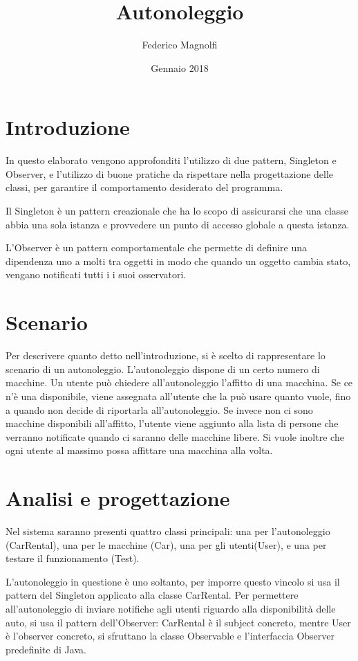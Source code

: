 \documentclass[]{article}
\newcommand{\subtitle}[1]{%
  \posttitle{%
    \par\end{center}
    \begin{center}\large#1\end{center}
    \vskip0.5em}%
}
\begin{document}
\title{Autonoleggio}
\subtitle{Ingegneria del Software - Approfondimento}
\author{Federico Magnolfi}
\date{Gennaio 2018}
\maketitle

\section*{Introduzione}
In questo elaborato vengono approfonditi l'utilizzo di due pattern, Singleton e Observer, e l'utilizzo di buone pratiche da rispettare nella progettazione delle classi, per garantire il comportamento desiderato del programma.

Il Singleton è un pattern creazionale che ha lo scopo di assicurarsi che una classe abbia una sola istanza e provvedere un punto di accesso globale a questa istanza.

L'Observer è un pattern comportamentale che permette di definire una dipendenza uno a molti tra oggetti in modo che quando un oggetto cambia stato, vengano notificati tutti i i suoi osservatori.

\section*{Scenario}
Per descrivere quanto detto nell'introduzione, si è scelto di rappresentare lo scenario di un autonoleggio. L'autonoleggio dispone di un certo numero di macchine. Un utente può chiedere all'autonoleggio l'affitto di una macchina. Se ce n'è una disponibile, viene assegnata all'utente che la può usare quanto vuole, fino a quando non decide di riportarla all'autonoleggio. Se invece non ci sono macchine disponibili all'affitto, l'utente viene aggiunto alla lista di persone che verranno notificate quando ci saranno delle macchine libere. Si vuole inoltre che ogni utente al massimo possa affittare una macchina alla volta.

\section*{Analisi e progettazione}
Nel sistema saranno presenti quattro classi principali: una per l'autonoleggio (CarRental), una per le macchine (Car), una per gli utenti(User), e una per testare il funzionamento (Test).

L'autonoleggio in questione è uno soltanto, per imporre questo vincolo si usa il pattern del Singleton applicato alla classe CarRental.
Per permettere all'autonoleggio di inviare notifiche agli utenti riguardo alla disponibilità delle auto, si usa il pattern dell'Observer: CarRental è il subject concreto, mentre User è l'observer concreto, si sfruttano la classe Observable e l'interfaccia Observer predefinite di Java.
\end{document}
